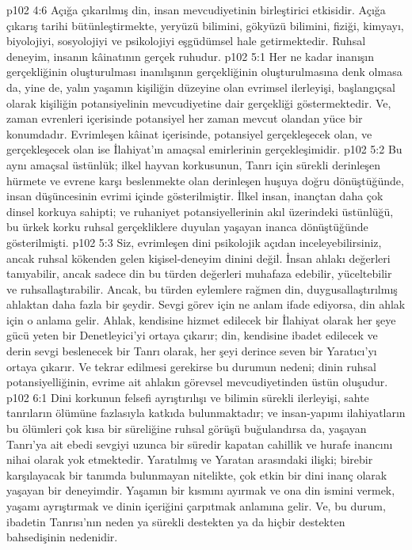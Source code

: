 \vs p102 4:6 Açığa çıkarılmış din, insan mevcudiyetinin birleştirici etkisidir. Açığa çıkarış tarihi bütünleştirmekte, yeryüzü bilimini, gökyüzü bilimini, fiziği, kimyayı, biyolojiyi, sosyolojiyi ve psikolojiyi eşgüdümsel hale getirmektedir. Ruhsal deneyim, insanın kâinatının gerçek ruhudur.
\vs p102 5:1 Her ne kadar inanışın gerçekliğinin oluşturulması inanılışının gerçekliğinin oluşturulmasına denk olmasa da, yine de, yalın yaşamın kişiliğin düzeyine olan evrimsel ilerleyişi, başlangıçsal olarak kişiliğin potansiyelinin mevcudiyetine dair gerçekliği göstermektedir. Ve, zaman evrenleri içerisinde potansiyel her zaman mevcut olandan yüce bir konumdadır. Evrimleşen kâinat içerisinde, potansiyel gerçekleşecek olan, ve gerçekleşecek olan ise İlahiyat’ın amaçsal emirlerinin gerçekleşimidir.
\vs p102 5:2 Bu aynı amaçsal üstünlük; ilkel hayvan korkusunun, Tanrı için sürekli derinleşen hürmete ve evrene karşı beslenmekte olan derinleşen huşuya doğru dönüştüğünde, insan düşüncesinin evrimi içinde gösterilmiştir. İlkel insan, inançtan daha çok dinsel korkuya sahipti; ve ruhaniyet potansiyellerinin akıl üzerindeki üstünlüğü, bu ürkek korku ruhsal gerçekliklere duyulan yaşayan inanca dönüştüğünde gösterilmişti.
\vs p102 5:3 Siz, evrimleşen dini psikolojik açıdan inceleyebilirsiniz, ancak ruhsal kökenden gelen kişisel\hyp{}deneyim dinini değil. İnsan ahlakı değerleri tanıyabilir, ancak sadece din bu türden değerleri muhafaza edebilir, yüceltebilir ve ruhsallaştırabilir. Ancak, bu türden eylemlere rağmen din, duygusallaştırılmış ahlaktan daha fazla bir şeydir. Sevgi görev için ne anlam ifade ediyorsa, din ahlak için o anlama gelir. Ahlak, kendisine hizmet edilecek bir İlahiyat olarak her şeye gücü yeten bir Denetleyici’yi ortaya çıkarır; din, kendisine ibadet edilecek ve derin sevgi beslenecek bir Tanrı olarak, her şeyi derince seven bir Yaratıcı’yı ortaya çıkarır. Ve tekrar edilmesi gerekirse bu durumun nedeni; dinin ruhsal potansiyelliğinin, evrime ait ahlakın görevsel mevcudiyetinden üstün oluşudur.
\vs p102 6:1 Dini korkunun felsefi ayrıştırılışı ve bilimin sürekli ilerleyişi, sahte tanrıların ölümüne fazlasıyla katkıda bulunmaktadır; ve insan\hyp{}yapımı ilahiyatların bu ölümleri çok kısa bir süreliğine ruhsal görüşü buğulandırsa da, yaşayan Tanrı’ya ait ebedi sevgiyi uzunca bir süredir kapatan cahillik ve hurafe inancını nihai olarak yok etmektedir. Yaratılmış ve Yaratan arasındaki ilişki; birebir karşılayacak bir tanımda bulunmayan nitelikte, çok etkin bir dini inanç olarak yaşayan bir deneyimdir. Yaşamın bir kısmını ayırmak ve ona din ismini vermek, yaşamı ayrıştırmak ve dinin içeriğini çarpıtmak anlamına gelir. Ve, bu durum, ibadetin Tanrısı’nın neden ya sürekli destekten ya da hiçbir destekten bahsedişinin nedenidir.
